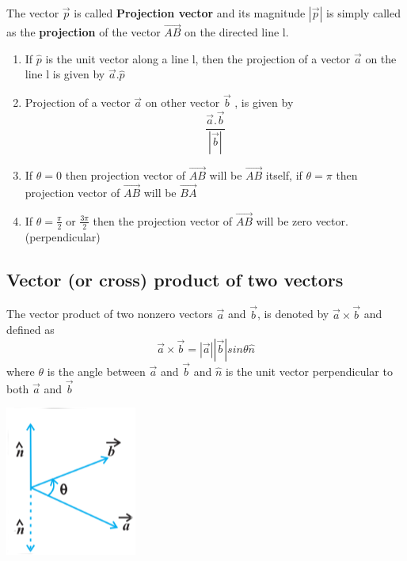 \documentclass[12pt]{article}
\begin{document}
\begin{multicols*}{2}
\begin{center}
\end{center}
The vector $\vec{p}$ is called \textbf{Projection vector } and its magnitude $|\vec{p}|$ is simply called as the \textbf{projection}
of the vector $\vec{AB}$ on the directed line l.
\begin{enumerate}
    \item If $\hat{p}$ is the unit vector along a line l, then the projection of a vector $\vec{a}$ on the line
    l is given by $\vec{a}.\hat{p}$
    \item Projection of a vector $\vec{a}$ on other vector $\vec{b}$ , is given by $$ \frac{\vec{a}.\vec{b}}{|\vec{b}|}$$
    \item If $\theta =0$ then projection vector of $\vec{AB}$ will be $\vec{AB}$ itself, if $\theta=\pi$ then projection vector of $\vec{AB}$ will be $\vec{BA}$
    \item If $\theta=\frac{\pi}{2}$ or $\frac{3\pi}{2}$ then the projection vector of $\vec{AB}$ will be zero vector.(perpendicular)
\end{enumerate}

\subsection*{Vector (or cross) product of two vectors}
The vector product of two nonzero vectors $\vec{a}$ and $\vec{b}$, is denoted by $\vec{a} \times \vec{b}$ and defined as $$\vec{a} \times \vec{b}=|\vec{a}||\vec{b}|sin \theta \hat{n}$$
where $\theta$ is the angle between $\vec{a}$ and $\vec{b}$ and $\hat{n}$ is the unit vector perpendicular to both $\vec{a}$ and $\vec{b}$
\begin{center}
    \includegraphics*[scale =0.5]{12.png}

\end{center}


\end{multicols*}
\end{document}
